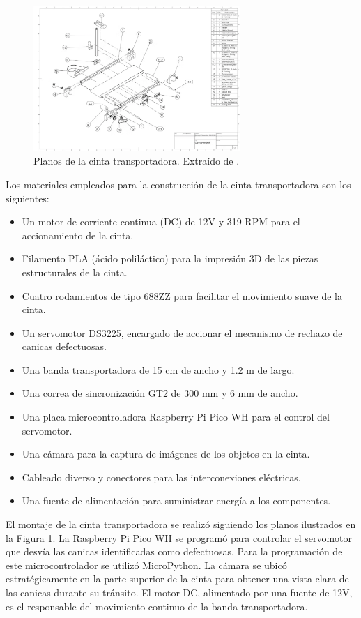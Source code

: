 \documentclass[11pt,spanish,listoffigures,listoftables]{tfgetsinf}
\begin{document}
\begin{figure}[H]
   \centering
   \includegraphics[width=0.7\textwidth]{images/prueba_de_concepto/planos_cinta.png}
   \caption[Planos de la cinta transportadora]{Planos de la cinta transportadora. Extraído de \cite{hackster_counting_inspection}.}
   \label{fig:planos_cinta}
\end{figure}

Los materiales empleados para la construcción de la cinta transportadora son los siguientes:

\begin{itemize}
   \item Un motor de corriente continua (DC) de 12V y 319 RPM para el accionamiento de la cinta.
   \item Filamento PLA (ácido poliláctico) para la impresión 3D de las piezas estructurales de la cinta.
   \item Cuatro rodamientos de tipo 688ZZ para facilitar el movimiento suave de la cinta.
   \item Un servomotor DS3225, encargado de accionar el mecanismo de rechazo de canicas defectuosas.
   \item Una banda transportadora de 15 cm de ancho y 1.2 m de largo.
   \item Una correa de sincronización GT2 de 300 mm y 6 mm de ancho.
   \item Una placa microcontroladora Raspberry Pi Pico WH para el control del servomotor.
   \item Una cámara para la captura de imágenes de los objetos en la cinta.
   \item Cableado diverso y conectores para las interconexiones eléctricas.
   \item Una fuente de alimentación para suministrar energía a los componentes.
\end{itemize}

El montaje de la cinta transportadora se realizó siguiendo los planos ilustrados en la Figura \ref{fig:planos_cinta}. La Raspberry Pi Pico WH se programó para controlar el servomotor que desvía las canicas identificadas como defectuosas. Para la programación de este microcontrolador se utilizó MicroPython\cite{micropython_home}. La cámara se ubicó estratégicamente en la parte superior de la cinta para obtener una vista clara de las canicas durante su tránsito. El motor DC, alimentado por una fuente de 12V, es el responsable del movimiento continuo de la banda transportadora.
\end{document}
